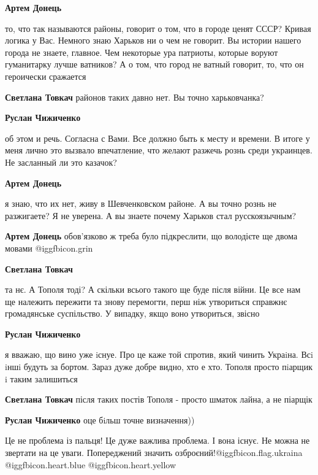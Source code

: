 \begin{itemize}
\begin{itemize}
\textbf{Артем Донець} 

то, что так называются районы, говорит о том, что в городе ценят СССР? Кривая
логика у Вас. Немного знаю Харьков ни о чем не говорит. Вы истории нашего
города не знаете, главное. Чем некоторые ура патриоты, которые воруют
гуманитарку лучше ватников? А о том, что город не ватный говорит, то, что он
героически сражается

\textbf{Светлана Товкач} районов таких давно нет. Вы точно харьковчанка?

\textbf{Руслан Чижиченко} 

об этом и речь. Согласна с Вами. Все должно быть к месту и времени. В итоге у
меня лично это вызвало впечатление, что желают разжечь рознь среди украинцев.
Не засланный ли это казачок?

\textbf{Артем Донець} 

я знаю, что их нет, живу в Шевченковском районе. А вы точно рознь не
разжигаете? Я не уверена. А вы знаете почему Харьков стал русскоязычным?

\textbf{Артем Донець} обов'язково ж треба було підкреслити, що володієте ще двома мовами  @igg{fbicon.grin} 

\textbf{Светлана Товкач} 

та нє. А Тополя тоді? А скільки всього такого ще буде після війни. Це все нам
ще належить пережити та знову перемогти, перш ніж утвориться справжнє
громадянське суспільство. У випадку, якщо воно утвориться, звісно

\textbf{Руслан Чижиченко} 

я вважаю, що вино уже iснуе. Про це каже той спротив, який чинить Украiна. Всi
iншi будуть за бортом. Зараз дуже добре видно, хто е хто. Тополя просто пiарщик
i таким залишиться

\textbf{Светлана Товкач} після таких постів Тополя - просто шматок лайна, а не піарщік

\textbf{Руслан Чижиченко} оце бiльш точне визначення))


Це не проблема із пальця! Це дуже важлива проблема. І вона існує. Не можна не
звертати на це уваги. Попереджений значить озброєний!@igg{fbicon.flag.ukraina} @igg{fbicon.heart.blue}  @igg{fbicon.heart.yellow} 

\end{itemize} %


\end{itemize}
